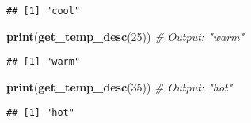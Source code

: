 \documentclass[
]{article}
\newenvironment{Shaded}{\begin{snugshade}}{\end{snugshade}}
\newcommand{\CommentTok}[1]{\textcolor[rgb]{0.56,0.35,0.01}{\textit{#1}}}
\newcommand{\DecValTok}[1]{\textcolor[rgb]{0.00,0.00,0.81}{#1}}
\newcommand{\FunctionTok}[1]{\textcolor[rgb]{0.13,0.29,0.53}{\textbf{#1}}}
\newcommand{\NormalTok}[1]{#1}
\begin{document}
\begin{verbatim}
## [1] "cool"
\end{verbatim}

\begin{Shaded}
\begin{Highlighting}[]
\FunctionTok{print}\NormalTok{(}\FunctionTok{get\_temp\_desc}\NormalTok{(}\DecValTok{25}\NormalTok{))   }\CommentTok{\# Output: "warm"}
\end{Highlighting}
\end{Shaded}

\begin{verbatim}
## [1] "warm"
\end{verbatim}

\begin{Shaded}
\begin{Highlighting}[]
\FunctionTok{print}\NormalTok{(}\FunctionTok{get\_temp\_desc}\NormalTok{(}\DecValTok{35}\NormalTok{))   }\CommentTok{\# Output: "hot"}
\end{Highlighting}
\end{Shaded}

\begin{verbatim}
## [1] "hot"
\end{verbatim}
\end{document}
